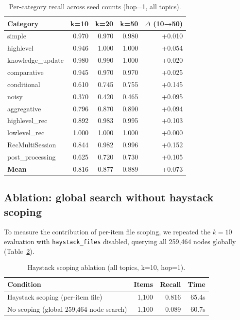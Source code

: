 \documentclass[11pt,a4paper]{article}
\begin{document}
\begin{table}[H]
\centering
\caption{Per-category recall across seed counts (hop=1, all topics).}
\label{tab:ksweep}
\begin{tabular}{lrrrr}
  \toprule
  \textbf{Category} & \textbf{k=10} & \textbf{k=20} & \textbf{k=50} & \textbf{$\Delta$ (10→50)} \\
  \midrule
  simple           & 0.970 & 0.970 & 0.980 & +0.010 \\
  highlevel        & 0.946 & 1.000 & 1.000 & +0.054 \\
  knowledge\_update & 0.980 & 0.990 & 1.000 & +0.020 \\
  comparative      & 0.945 & 0.970 & 0.970 & +0.025 \\
  conditional      & 0.610 & 0.745 & 0.755 & +0.145 \\
  noisy            & 0.370 & 0.420 & 0.465 & +0.095 \\
  aggregative      & 0.796 & 0.870 & 0.890 & +0.094 \\
  highlevel\_rec    & 0.892 & 0.983 & 0.995 & +0.103 \\
  lowlevel\_rec     & 1.000 & 1.000 & 1.000 & +0.000 \\
  RecMultiSession  & 0.844 & 0.982 & 0.996 & +0.152 \\
  post\_processing  & 0.625 & 0.720 & 0.730 & +0.105 \\
  \midrule
  \textbf{Mean}    & 0.816 & 0.877 & 0.889 & +0.073 \\
  \bottomrule
\end{tabular}
\end{table}

\subsection{Ablation: global search without haystack scoping}

To measure the contribution of per-item file scoping, we repeated the
$k{=}10$ evaluation with \texttt{haystack\_files} disabled, querying all
259,464 nodes globally (Table~\ref{tab:ablation}).

\begin{table}[H]
\centering
\caption{Haystack scoping ablation (all topics, k=10, hop=1).}
\label{tab:ablation}
\begin{tabular}{lrrr}
  \toprule
  \textbf{Condition} & \textbf{Items} & \textbf{Recall} & \textbf{Time} \\
  \midrule
  Haystack scoping (per-item file) & 1,100 & 0.816 & 65.4s \\
  No scoping (global 259,464-node search) & 1,100 & 0.089 & 60.7s \\
  \bottomrule
\end{tabular}
\end{table}
\end{document}
